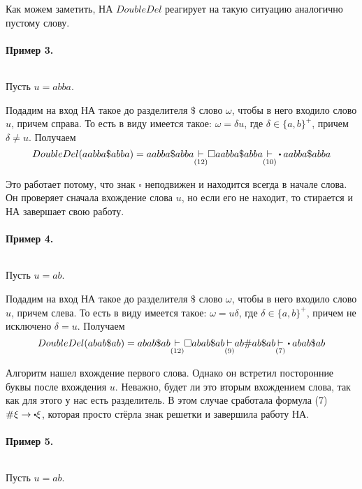 Как можем заметить, НА $DoubleDel$ реагирует на такую ситуацию аналогично пустому слову.


\paragraph*{Пример 3.} ${}$ \newline

Пусть $u = abba$.

Подадим на вход НА такое до разделителя $\$$ слово $\omega$,
чтобы в него входило слово  $u$, причем справа. То есть
в виду имеется такое:  $\omega = \delta u$, где  $\delta \in \{a,b\}^{+}$, причем 
$\delta \neq  u$. Получаем
\[
    DoubleDel(aabba\$abba) = aabba\$abba \underset{(12)}{\step} \square aabba\$abba
    \underset{(10)}{\step}\bigcdot aabba\$abba
\]

Это работает потому, что знак $\square$ неподвижен и находится всегда в начале слова.
Он проверяет сначала вхождение слова  $u$, но если его не находит, то стирается и НА завершает
свою работу.


\paragraph*{Пример 4.} ${}$ \newline

Пусть $u = ab$.

Подадим на вход НА такое до разделителя $\$$ слово  $\omega$,
чтобы в него входило слово  $u$, причем слева. То есть
в виду имеется такое:  $\omega = u\delta$, где  $\delta \in \{a,b\}^{+} $, причем
не исключено $\delta = u$. Получаем
\[
    DoubleDel(abab\$ab) = abab\$ab \underset{(12)}{\step} \square abab\$ab
    \underset{(9)}{\step} ab\#ab\$ab \underset{(7)}{\step}\bigcdot abab\$ab
\]

Алгоритм нашел вхождение первого слова. Однако он встретил посторонние буквы после вхождения
$u$. Неважно, будет ли это вторым вхождением слова, так как для этого у нас есть разделитель.
В этом случае сработала формула (7)  $\#\xi \to \bigcdot \xi$, которая просто стёрла знак
решетки и завершила работу НА.



\paragraph*{Пример 5.} ${}$ \newline

Пусть $u = ab$.

